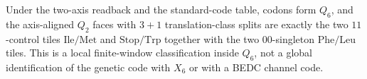 \begin{corollary}
\label{cor:philosophy-boundary-tile-allowed-claim}
Under the two-axis readback and the standard-code table, codons form
$Q_{6}$, and the axis-aligned $Q_{2}$ faces with $3+1$ translation-class
splits are exactly the two $11$-control tiles $\mathrm{Ile}/\mathrm{Met}$
and $\mathrm{Stop}/\mathrm{Trp}$ together with the two $00$-singleton
$\mathrm{Phe}/\mathrm{Leu}$ tiles. This is a local finite-window
classification inside $Q_{6}$, not a global identification of the genetic
code with $X_{6}$ or with a BEDC channel code.
\end{corollary}

